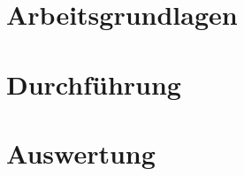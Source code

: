 \documentclass{fhnwreport/fhnwreport}
\begin{document}


\clearpage
\section{Arbeitsgrundlagen}
\label{sec:arbeitsgrundlagen}



\clearpage
\section{Durchf\"uhrung}
\label{sec:durchfuehrung}



\clearpage
\section{Auswertung}
\label{sec:auswertung}



%


%


%


\clearpage
{}
{}
{}
\end{document}
